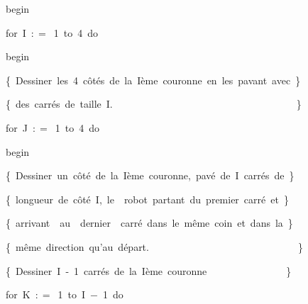 {\vspace{\neglskip}\mbox{\blc  \idt  \mcl begin\idt \ }\par 
\pagebreak[3] 
\vspace{\neglskip}\mbox{\blc  \blk\idt  \mcl for\idt \ I\ $:$$=$\ 1\ \mcl to\idt \ 4\ \mcl do\idt }\par 
\vspace{\neglskip}\mbox{\blc  \blk\blk\idt  \mcl begin\idt }\par 
\vspace{\neglskip}\mbox{\blc  \blk\blk\blk\idt  \cmt  \{\ Dessiner\ les\ 4\ côtés\ de\ la\ Ième\ couronne\ en\ les\ pavant\ avec\ \}\idt }\par 
\vspace{\neglskip}\mbox{\blc  \blk\blk\blk\idt  \cmt  \{\ des\ carrés\ de\ taille\ I.\ \ \ \ \ \ \ \ \ \ \ \ \ \ \ \ \ \ \ \ \ \ \ \ \ \ \ \ \ \ \ \ \ \ \ \ \ \}\idt }\par 
\pagebreak[3] 
\vspace{\neglskip}\mbox{\blc  \blk\blk\blk\idt  \mcl for\idt \ J\ $:$$=$\ 1\ \mcl to\idt \ 4\ \mcl do\idt }\par 
\vspace{\neglskip}\mbox{\blc  \blk\blk\blk\blk\idt  \mcl begin\idt }\par 
\vspace{\neglskip}\mbox{\blc  \blk\blk\blk\blk\blk\idt  \cmt  \{\ Dessiner\ un\ côté\ de\ la\ Ième\ couronne,\ pavé\ de\ I\ carrés\ de\ \}\idt }\par 
\vspace{\neglskip}\mbox{\blc  \blk\blk\blk\blk\blk\idt  \cmt  \{\ longueur\ de\ côté\ I,\ le\ \ robot\ partant\ du\ premier\ carré\ et\ \}\idt }\par 
\vspace{\neglskip}\mbox{\blc  \blk\blk\blk\blk\blk\idt  \cmt  \{\ arrivant\ \ au\ \ dernier\ \ carré\ dans\ le\ même\ coin\ et\ dans\ la\ \}\idt }\par 
\vspace{\neglskip}\mbox{\blc  \blk\blk\blk\blk\blk\idt  \cmt  \{\ même\ direction\ qu{'}au\ départ.\ \ \ \ \ \ \ \ \ \ \ \ \ \ \ \ \ \ \ \ \ \ \ \ \ \ \ \ \ \ \}\idt }\par 
\vspace{\neglskip}\mbox{\blc  \blk\blk\blk\blk\blk\blk\idt  \cmt  \{\ Dessiner\ I\ -\ 1\ carrés\ de\ la\ Ième\ couronne\ \ \ \ \ \ \ \ \ \ \ \ \ \ \ \ \}\idt }\par 
\pagebreak[3] 
\vspace{\neglskip}\mbox{\blc  \blk\blk\blk\blk\blk\blk\blk\idt  \mcl for\idt \ K\ $:$$=$\ 1\ \mcl to\idt \ I\ $-$\ 1\ \mcl do\idt }\par 
}
